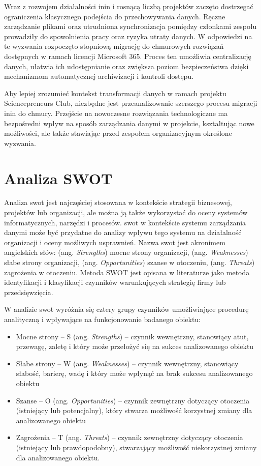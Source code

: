 Wraz z rozwojem działalności \gls{inin} i rosnącą liczbą projektów zaczęto dostrzegać ograniczenia klasycznego podejścia do przechowywania danych. Ręczne zarządzanie plikami oraz utrudniona synchronizacja pomiędzy członkami zespołu prowadziły do spowolnienia pracy oraz ryzyka utraty danych. W odpowiedzi na te wyzwania rozpoczęto stopniową migrację do chmurowych rozwiązań dostępnych w ramach licencji Microsoft 365. Proces ten umożliwia centralizację danych, ułatwia ich udostępnianie oraz zwiększa poziom bezpieczeństwa dzięki mechanizmom automatycznej archiwizacji i kontroli dostępu.

Aby lepiej zrozumieć kontekst transformacji danych w ramach projektu Sciencepreneurs Club, niezbędne jest przeanalizowanie szerszego procesu migracji \gls{inin} do chmury. Przejście na nowoczesne rozwiązania technologiczne ma bezpośredni wpływ na sposób zarządzania danymi w projekcie, kształtując nowe możliwości, ale także stawiając przed zespołem organizacyjnym określone wyzwania.

\section{Analiza SWOT}
Analiza \gls{swot} jest najczęściej stosowana w kontekście strategii biznesowej, projektów lub organizacji, ale można ją także wykorzystać do oceny systemów informatycznych, narzędzi i procesów. \gls{swot} w kontekście systemu zarządzania danymi może być przydatne do analizy wpływu tego systemu na działalność organizacji i oceny możliwych usprawnień. Nazwa \gls{swot} jest akronimem angielskich słów: (ang. \textit{Strengths}) mocne strony organizacji, (ang. \textit{Weaknesses}) słabe strony organizacji, (ang. \textit{Opportunities}) szanse w otoczeniu, (ang. \textit{Threats}) zagrożenia w otoczeniu. Metoda SWOT jest opisana w literaturze jako metoda identyfikacji i klasyfikacji czynników warunkujących strategię firmy lub przedsięwzięcia. \parencite[s. 80]{szmitka2015} 

W analizie \gls{swot} wyróżnia się cztery grupy czynników umożliwiające procedurę analityczną i wpływające na funkcjonowanie badanego obiektu:
\begin{itemize}
    \item Mocne strony – S (ang. \textit{Strengths}) – czynnik wewnętrzny, stanowiący atut, przewagę, zaletę i który może przełożyć się na sukces analizowanego obiektu
    \item Słabe strony – W (ang. \textit{Weaknesses}) – czynnik wewnętrzny, stanowiący słabość, barierę, wadę i który może wpłynąć na brak sukcesu analizowanego obiektu
    \item Szanse – O (ang. \textit{Opportunities}) – czynnik zewnętrzny dotyczący otoczenia (istniejący lub potencjalny), który stwarza możliwość korzystnej zmiany dla analizowanego obiektu
    \item Zagrożenia – T (ang. \textit{Threats}) – czynnik zewnętrzny dotyczący otoczenia (istniejący lub prawdopodobny), stwarzający możliwość niekorzystnej zmiany dla analizowanego obiektu. 
\end{itemize}

